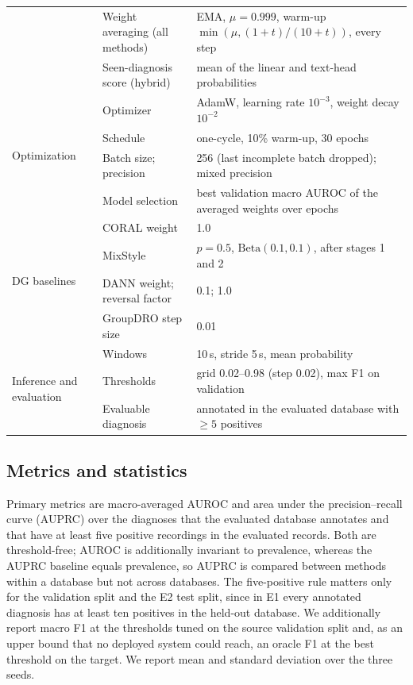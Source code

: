 \begin{table}[!htbp]
\begin{tabularx}{\textwidth}{@{}l l X@{}}
 & Weight averaging (all methods) & EMA, $\mu=0.999$, warm-up $\min(\mu,(1+t)/(10+t))$, every step \\
 & Seen-diagnosis score (hybrid) & mean of the linear and text-head probabilities \\
\midrule
\multirow{4}{*}{Optimization}
 & Optimizer & AdamW, learning rate $10^{-3}$, weight decay $10^{-2}$ \\
 & Schedule & one-cycle, 10\% warm-up, 30 epochs \\
 & Batch size; precision & 256 (last incomplete batch dropped); mixed precision \\
 & Model selection & best validation macro AUROC of the averaged weights over epochs \\
\midrule
\multirow{4}{*}{DG baselines}
 & CORAL weight & 1.0 \\
 & MixStyle & $p=0.5$, $\mathrm{Beta}(0.1,0.1)$, after stages 1 and 2 \\
 & DANN weight; reversal factor & 0.1; 1.0 \\
 & GroupDRO step size & 0.01 \\
\midrule
\multirow{3}{*}{Inference and evaluation}
 & Windows & 10\,s, stride 5\,s, mean probability \\
 & Thresholds & grid 0.02--0.98 (step 0.02), max F1 on validation \\
 & Evaluable diagnosis & annotated in the evaluated database with $\ge5$ positives \\
\bottomrule
\end{tabularx}
\end{table}

\subsection{Metrics and statistics}\label{sec:metrics}
Primary metrics are macro-averaged AUROC and area under the precision--recall curve (AUPRC) over the diagnoses that the evaluated database annotates and that have at least five positive recordings in the evaluated records. Both are threshold-free; AUROC is additionally invariant to prevalence, whereas the AUPRC baseline equals prevalence, so AUPRC is compared between methods within a database but not across databases. The five-positive rule matters only for the validation split and the E2 test split, since in E1 every annotated diagnosis has at least ten positives in the held-out database. We additionally report macro F1 at the thresholds tuned on the source validation split and, as an upper bound that no deployed system could reach, an oracle F1 at the best threshold on the target. We report mean and standard deviation over the three seeds.


